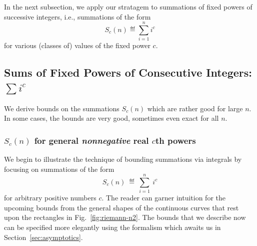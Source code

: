 \bigskip

\noindent {}

\bigskip

In the next subsection, we apply our stratagem to summations of fixed powers of successive integers, i.e., summations of the form
\[ S_c(n) \eqdef \sum_{i=1}^n i^c \]
for various (classes of) values of the fixed power $c$.


\subsection{Sums of Fixed Powers of Consecutive Integers: $\sum i^c$}
\label{sec:sum-of-i2c}

We derive bounds on the summations $S_c(n)$ which are rather good for large $n$.  In some cases, the bounds are very good, sometimes even exact for all $n$.

\subsubsection{$S_c(n)$ for general {\em nonnegative} real $c$th powers}
\label{sec:sum-of-i2c>0}

We begin to illustrate the technique of bounding summations via integrals by focusing on summations of the form
\[ S_c(n) \ \eqdef \ \sum_{i=1}^n \ i^c \]
for arbitrary positive numbers $c$.  The reader can garner intuition for the upcoming bounds from the general shapes of the continuous curves that rest upon the rectangles in Fig.~\ref{fig:riemann-n2}.  The bounds that we describe now can be specified more elegantly using the formalism which awaits us in Section~\ref{sec:asymptotics}.

\medskip

